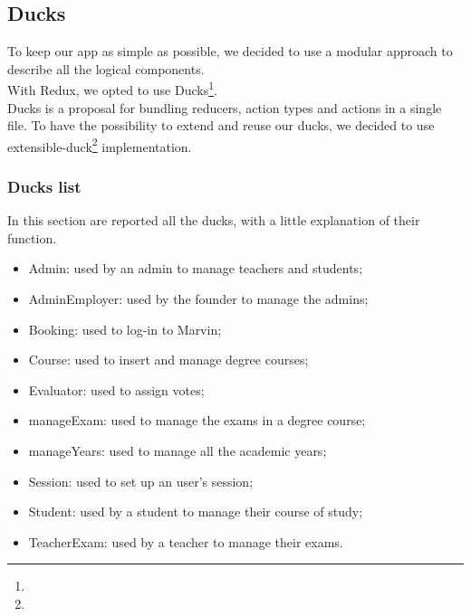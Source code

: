 \documentclass[../redux]{subfiles}
\begin{document}
	\subsection{Ducks}
	To keep our app as simple as possible, we decided to use a modular approach to describe all the logical components.\\
	With Redux, we opted to use Ducks\footnote{}.\\
	Ducks is a proposal for bundling reducers, action types and actions in a single file. To have the possibility to extend and reuse our ducks, we decided to use extensible-duck\footnote{} implementation.

	\subsubsection{Ducks list}
	In this section are reported all the ducks, with a little explanation of their function.
	\begin{itemize}
		\item Admin: used by an admin to manage teachers and students;
		\item AdminEmployer: used by the founder to manage the admins;
		\item Booking: used to log-in to Marvin;
		\item Course: used to insert and manage degree courses;
		\item Evaluator: used to assign votes;
		\item manageExam: used to manage the exams in a degree course;
		\item manageYears: used to manage all the academic years;
		\item Session: used to set up an user's session;
		\item Student: used by a student to manage their course of study;
		\item TeacherExam: used by a teacher to manage their exams.
	\end{itemize}
\end{document}
